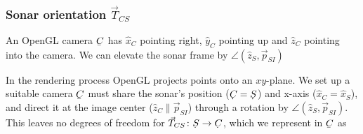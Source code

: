 %


\subsubsection{Sonar orientation \texorpdfstring{$\vec{T}_{CS}$}{T\_CS}}

%


An OpenGL camera $\ubar{C}$ has $\hat{x}_C$ pointing right, $\hat{y}_C$ pointing up and $\hat{z}_C$ pointing into the camera. We can elevate the sonar frame by $\angle(\hat{z}_S,\vec{p}_{SI})$ 

In the rendering process OpenGL projects points onto an $xy$-plane. We set up a suitable camera $\ubar{C}$ must share the sonar's position ($\udot{C}=\udot{S}$) and x-axis ($\hat{x}_C=\hat{x}_S$), and direct it at the image center ($\hat{z}_C\parallel\vec{p}_{SI}$) through a rotation by $\angle(\hat{z}_S,\vec{p}_{SI})$. 
%
%
%
%
%
This leaves no degrees of freedom for $\vec{T}_{CS}\colon \udot{S}\to\udot{C}$, which we represent in $\ubar{C}$ as
%
%
%

